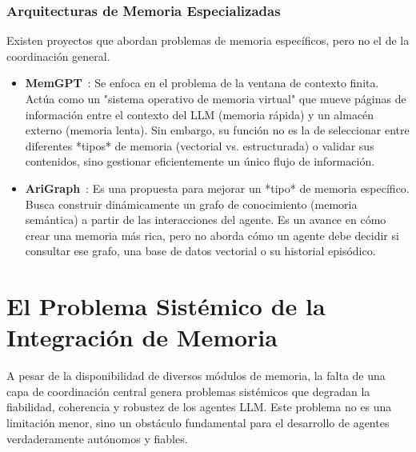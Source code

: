 \documentclass[conference]{IEEEtran}
\begin{document}
\subsubsection{Arquitecturas de Memoria Especializadas}
Existen proyectos que abordan problemas de memoria específicos, pero no el de la coordinación general.
\begin{itemize}
    \item \textbf{MemGPT}~\cite{packer2023memgpt}: Se enfoca en el problema de la ventana de contexto finita. Actúa como un "sistema operativo de memoria virtual" que mueve páginas de información entre el contexto del LLM (memoria rápida) y un almacén externo (memoria lenta). Sin embargo, su función no es la de seleccionar entre diferentes *tipos* de memoria (vectorial vs. estructurada) o validar sus contenidos, sino gestionar eficientemente un único flujo de información.
    \item \textbf{AriGraph}~\cite{anokhin2024arigraph}: Es una propuesta para mejorar un *tipo* de memoria específico. Busca construir dinámicamente un grafo de conocimiento (memoria semántica) a partir de las interacciones del agente. Es un avance en cómo crear una memoria más rica, pero no aborda cómo un agente debe decidir si consultar ese grafo, una base de datos vectorial o su historial episódico.
\end{itemize}

\section{El Problema Sistémico de la Integración de Memoria}

A pesar de la disponibilidad de diversos módulos de memoria, la falta de una capa de coordinación central genera problemas sistémicos que degradan la fiabilidad, coherencia y robustez de los agentes LLM. Este problema no es una limitación menor, sino un obstáculo fundamental para el desarrollo de agentes verdaderamente autónomos y fiables.
\end{document}
